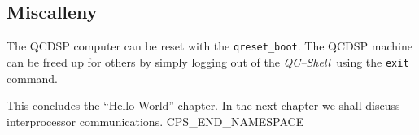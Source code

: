 \subsection{Miscalleny}
The QCDSP computer can be reset with the {\tt qreset\_boot}. The 
QCDSP machine can be freed up for others by simply logging out of 
the {\em QC--Shell}\ using the {\tt exit} command.

This concludes the ``Hello World'' chapter. In the next chapter
we shall discuss interprocessor communications.
CPS_END_NAMESPACE
